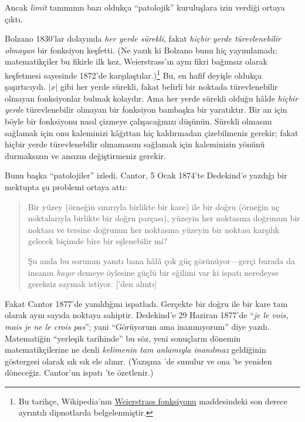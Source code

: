 \documentclass[../../../include/open-logic-section]{subfiles}
\begin{document}

Ancak \emph{limit} tanımının bazı oldukça ``patolojik'' kuruluşlara izin
verdiği ortaya çıktı.

Bolzano 1830'lar dolayında \emph{her yerde sürekli}, fakat \emph{hiçbir yerde
türevlenebilir olmayan} bir fonksiyon keşfetti. (Ne yazık ki Bolzano bunu hiç
yayımlamadı; matematikçiler bu fikirle ilk kez, Weierstrass'ın aynı fikri
bağımsız olarak keşfetmesi sayesinde 1872'de karşılaştılar.)\footnote{Bu
tarihçe, Wikipedia'nın
\href{http://en.wikipedia.org/wiki/Weierstrass_function}{Weierstrass
fonksiyonu} maddesindeki son derece ayrıntılı dipnotlarda belgelenmiştir.}
Bu, en hafif deyişle oldukça şaşırtıcıydı. $|x|$ gibi her yerde sürekli,
fakat belirli bir noktada türevlenebilir olmayan fonksiyonlar bulmak kolaydır.
Ama her yerde sürekli olduğu hâlde \emph{hiçbir yerde} türevlenebilir olmayan
bir fonksiyon bambaşka bir yaratıktır. Bir an için böyle bir fonksiyonu nasıl
çizmeye çalışacağınızı düşünün. Sürekli olmasını sağlamak için onu kaleminizi
kâğıttan hiç kaldırmadan çizebilmeniz gerekir; fakat hiçbir yerde
türevlenebilir olmamasını sağlamak için kaleminizin yönünü durmaksızın ve
ansızın değiştirmeniz gerekir.

Bunu başka ``patolojiler'' izledi. Cantor, 5 Ocak 1874'te Dedekind'e yazdığı
bir mektupta şu problemi ortaya attı:
\begin{quote}
Bir yüzey (örneğin sınırıyla birlikte bir kare) ile bir doğru (örneğin uç
noktalarıyla birlikte bir doğru parçası), yüzeyin her noktasına doğrunun bir
noktası ve tersine doğrunun her noktasına yüzeyin bir noktası karşılık
gelecek biçimde bire bir eşlenebilir mi?

Şu anda bu sorunun yanıtı bana hâlâ çok güç görünüyor---gerçi burada da
insanın \emph{hayır} demeye öylesine güçlü bir eğilimi var ki ispatı neredeyse
gereksiz saymak istiyor. [\citealt{Gouvea2011}'den alıntı]
\end{quote}
Fakat Cantor 1877'de yanıldığını ispatladı. Gerçekte bir doğru ile bir kare
tam olarak aynı sayıda noktaya sahiptir. Dedekind'e 29 Haziran 1877'de
``\emph{je le vois, mais je ne le crois pas}''; yani ``Görüyorum ama
inanmıyorum'' diye yazdı. Matematiğin ``yerleşik tarihinde'' bu söz, yeni
sonuçların dönemin matematikçilerine ne denli \emph{kelimenin tam anlamıyla
inanılmaz} geldiğinin göstergesi olarak sık sık ele alınır. (Yazışma
\citet{Gouvea2011}'de sunulur ve ona 'te
yeniden döneceğiz. Cantor'un ispatı 'te
özetlenir.)
\end{document}
